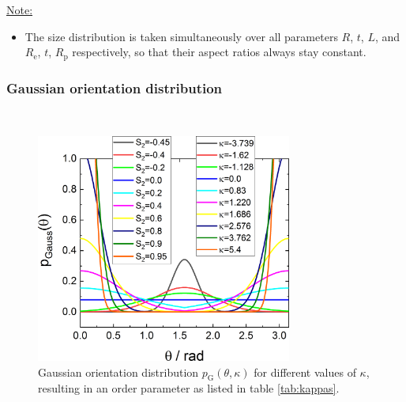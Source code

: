 \vspace{5mm}

\uline{Note:}
\begin{itemize}
\item The size distribution is taken simultaneously over all parameters $R$, $t$, $L$, and $R_\mathrm{e}$, $t$, $R_\mathrm{p}$ respectively, so that their aspect ratios always stay constant.
\end{itemize}

\newpage
\subsubsection{Gaussian orientation distribution}
\label{sect:ShearedCylinderGaussian}
~\\

\begin{figure}[htb]
\includegraphics[width=0.75\textwidth]{../images/form_factor/cylindrical_obj/pGaussGr.png}
\caption{Gaussian orientation distribution $p_\mathrm{G}(\theta,\kappa)$ for different values of $\kappa$, resulting in an order parameter as listed in table \ref{tab:kappas}.}
\label{fig:pGaussGr}
\end{figure}

